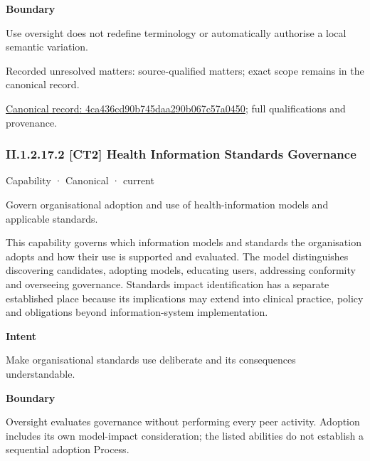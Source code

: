 \textbf{Boundary}



Use oversight does not redefine terminology or automatically authorise a local semantic variation.


{\small Recorded unresolved matters: source-qualified matters; exact scope remains in the canonical record.}\par
{\footnotesize \href{../../../../../../../continuum/strategy/capability/4ca436cd90b745daa290b067c57a0450.md}{Canonical record: 4ca436cd90b745daa290b067c57a0450}; full qualifications and provenance.}\par
\subsubsection*{II.1.2.17.2 [CT2] Health Information Standards Governance}
\label{navigation:II.1.2.17.2}

\label{element:b228039d8e764f9b98cb810b68af329d}
{\small Capability · Canonical · current}\par

Govern organisational adoption and use of health-information models and applicable standards.



This capability governs which information models and standards the organisation adopts and how their use is supported and evaluated. The model distinguishes discovering candidates, adopting models, educating users, addressing conformity and overseeing governance. Standards impact identification has a separate established place because its implications may extend into clinical practice, policy and obligations beyond information-system implementation.



\textbf{Intent}



Make organisational standards use deliberate and its consequences understandable.



\textbf{Boundary}



Oversight evaluates governance without performing every peer activity. Adoption includes its own model-impact consideration; the listed abilities do not establish a sequential adoption Process.


